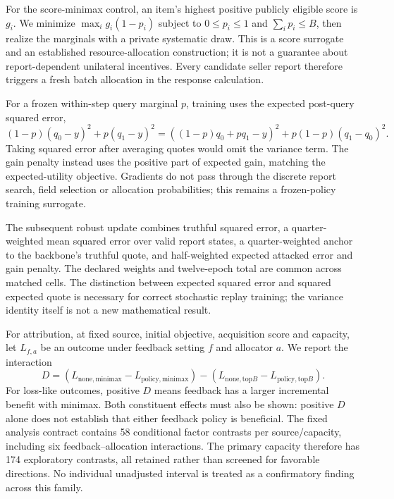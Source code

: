 \documentclass[11pt]{article}
\begin{document}
For the score-minimax control, an item's highest positive publicly eligible
score is $g_i$. We minimize $\max_i g_i(1-p_i)$ subject to $0\le p_i\le1$ and
$\sum_i p_i\le B$, then realize the marginals with a private systematic draw.
This is a score surrogate and an established resource-allocation construction;
it is not a guarantee about report-dependent unilateral incentives. Every
candidate seller report therefore triggers a fresh batch allocation in the
response calculation.

For a frozen within-step query marginal $p$, training uses the expected
post-query squared error,
\[
 (1-p)(q_0-y)^2+p(q_1-y)^2
 =((1-p)q_0+pq_1-y)^2+p(1-p)(q_1-q_0)^2.
\]
Taking squared error after averaging quotes would omit the variance term.
The gain penalty instead uses the positive part of expected gain, matching
the expected-utility objective. Gradients do not pass through the discrete
report search, field selection or allocation probabilities; this remains a
frozen-policy training surrogate.

The subsequent robust update combines truthful squared error, a quarter-weighted
mean squared error over valid report states, a quarter-weighted anchor to the
backbone's truthful quote, and half-weighted expected attacked error and gain
penalty. The declared weights and twelve-epoch total are common across matched
cells. The distinction between expected squared error and squared expected
quote is necessary for correct stochastic replay training; the variance identity
itself is not a new mathematical result.

For attribution, at fixed source, initial objective, acquisition score and
capacity, let $L_{f,a}$ be an outcome under feedback setting $f$ and allocator
$a$. We report the interaction
\[
 D=(L_{\mathrm{none},\mathrm{minimax}}-L_{\mathrm{policy},\mathrm{minimax}})
  -(L_{\mathrm{none},\mathrm{top}B}-L_{\mathrm{policy},\mathrm{top}B}).
\]
For loss-like outcomes, positive $D$ means feedback has a larger incremental
benefit with minimax. Both constituent effects must also be shown: positive
$D$ alone does not establish that either feedback policy is beneficial. The
fixed analysis contract contains 58 conditional factor contrasts per
source/capacity, including six feedback--allocation interactions. The primary
capacity therefore has 174 exploratory contrasts, all retained rather than
screened for favorable directions. No individual unadjusted interval is treated
as a confirmatory finding across this family.
\end{document}
